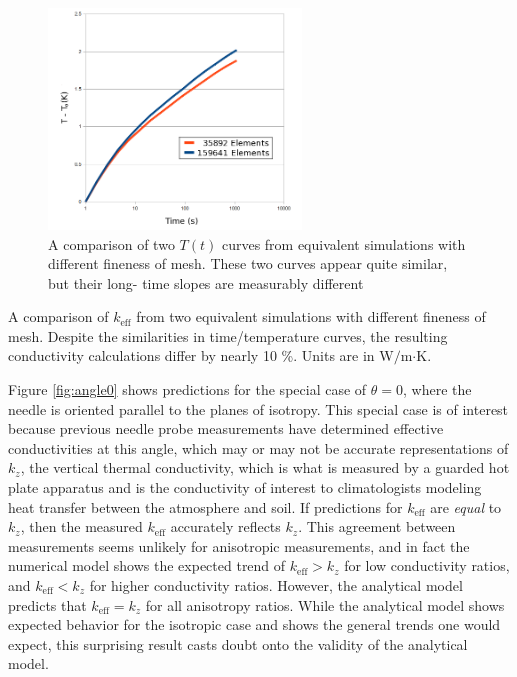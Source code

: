 \begin{figure}[h]
\centering
\includegraphics[width=0.6\textwidth]{fig/conv_curves.png}
\caption{A comparison of two \(T(t)\) curves from equivalent simulations with 
different fineness of mesh. These two curves appear quite similar, but their long-
time slopes are measurably different}
\label{fig:conv_curves}
\end{figure}


\begin{table}[h]
\centering

\caption{A comparison of \(k_{\textrm{eff}}\) from two equivalent simulations 
with different fineness of mesh. Despite the similarities in time/temperature
curves, the resulting  conductivity calculations differ by nearly 10 \%. Units are in W\(/\)m\(\cdot\)K.}
\label{tab:conv_kvals}
\end{table}

Figure \ref{fig:angle0} shows predictions for the special case of
\(\theta = 0 \), where the needle is oriented parallel to the planes of isotropy.
This special case is of interest because previous needle probe measurements have
determined effective conductivities at this angle, which may or may not be
accurate representations of \(k_z\), the vertical thermal conductivity, which is
what is measured by a guarded hot plate apparatus and is the conductivity
of interest to climatologists modeling heat transfer between the atmosphere and
soil. If predictions for \(k_{\textrm{eff}}\) are \emph{equal} to \(k_z\), then
the measured \(k_{\textrm{eff}}\) accurately reflects \(k_z\). This agreement
between measurements seems unlikely for anisotropic measurements, and in fact 
the numerical model shows the expected trend of \(k_{\textrm{eff}} > k_z\) for
low conductivity ratios, and \(k_{\textrm{eff}} < k_z\) for higher conductivity
ratios. However, the analytical model predicts that \(k_{\textrm{eff}} = k_z\)
for all anisotropy ratios. While the analytical model shows expected behavior
for the isotropic case and shows the general trends one would expect, this
surprising result casts doubt onto the validity of the analytical model.


